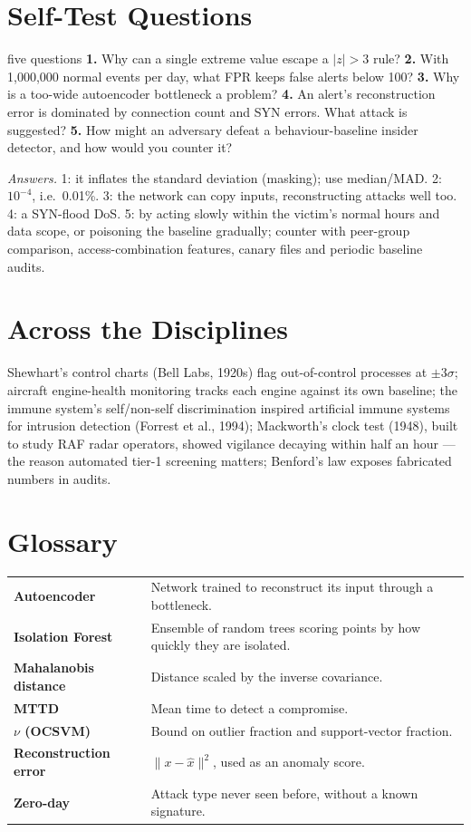 \documentclass[11pt]{article}
\begin{document}
\section{Self-Test Questions}
\begin{question}{five questions}
\textbf{1.} Why can a single extreme value escape a $|z|>3$ rule? \textbf{2.} With 1,000,000 normal events per day, what FPR keeps false alerts below 100? \textbf{3.} Why is a too-wide autoencoder bottleneck a problem? \textbf{4.} An alert's reconstruction error is dominated by connection count and SYN errors. What attack is suggested? \textbf{5.} How might an adversary defeat a behaviour-baseline insider detector, and how would you counter it?

\textit{Answers.} 1: it inflates the standard deviation (masking); use median/MAD. 2: $10^{-4}$, i.e.\ 0.01\%. 3: the network can copy inputs, reconstructing attacks well too. 4: a SYN-flood DoS. 5: by acting slowly within the victim's normal hours and data scope, or poisoning the baseline gradually; counter with peer-group comparison, access-combination features, canary files and periodic baseline audits.
\end{question}

\section{Across the Disciplines}
Shewhart's control charts (Bell Labs, 1920s) flag out-of-control processes at $\pm3\sigma$; aircraft engine-health monitoring tracks each engine against its own baseline; the immune system's self/non-self discrimination inspired artificial immune systems for intrusion detection (Forrest et al., 1994); Mackworth's clock test (1948), built to study RAF radar operators, showed vigilance decaying within half an hour --- the reason automated tier-1 screening matters; Benford's law exposes fabricated numbers in audits.

\section{Glossary}
\begin{center}\small\renewcommand{\arraystretch}{1.2}
\begin{tabularx}{\textwidth}{>{\bfseries}p{3.3cm}X}\toprule
Autoencoder & Network trained to reconstruct its input through a bottleneck.\\
Isolation Forest & Ensemble of random trees scoring points by how quickly they are isolated.\\
Mahalanobis distance & Distance scaled by the inverse covariance.\\
MTTD & Mean time to detect a compromise.\\
$\nu$ (OCSVM) & Bound on outlier fraction and support-vector fraction.\\
Reconstruction error & $\|x-\hat x\|^2$, used as an anomaly score.\\
Zero-day & Attack type never seen before, without a known signature.\\\bottomrule
\end{tabularx}\end{center}
\end{document}
